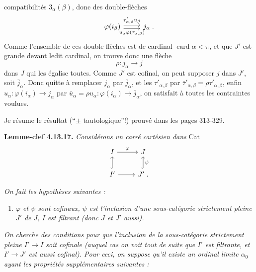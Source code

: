 \documentclass[11pt]{article}
\newcommand{\printedpage}[1]{\marginpar{\footnotesize p.~#1}}
\newcommand{\msp}[1]{\marginpar{\footnotesize [#1]}}
\newcommand{\card}{\operatorname{card}}
\begin{document}
\printedpage{124}

compatibilités $3_\alpha(\beta)$, donc des double-flèches
\[
\begin{tikzcd}
\varphi(i_\beta) \arrow[r, shift left, "\tau'_{\alpha,\beta}u_\beta"] \arrow[r, shift right, "u_\alpha\varphi(\tau_{\alpha,\beta})"'] & j_\alpha \; .
\end{tikzcd}
\]
Comme l'ensemble de ces double-flèches est de cardinal $\card\alpha < \pi$, et que $J'$ est grande devant ledit cardinal, on
\msp{page 329}
trouve donc une flèche
\[
\rho : j_\alpha \longrightarrow j
\]
dans $J$ qui les égalise toutes. Comme $J'$ est cofinal, on peut supposer $j$ dans $J'$, soit $\bar{j}_\alpha$. Donc quitte à remplacer $j_\alpha$ par $\bar{j}_\alpha$, et les $\tau'_{\alpha,\beta}$ par $\bar{\tau}'_{\alpha,\beta} = \rho\tau'_{\alpha,\beta}$, enfin $u_\alpha : \varphi(i_\alpha) \longrightarrow j_\alpha$ par $\bar{u}_\alpha = \rho u_\alpha : \varphi(i_\alpha) \longrightarrow \bar{j}_\alpha$, on satisfait à toutes les contraintes voulues.

Je résume le résultat (``$\pm$ tautologique''!) prouvé dans les pages 313-329.

\textbf{Lemme-clef 4.13.17.} \textit{Considérons un carré cartésien dans} Cat
\[
\begin{tikzcd}
I \arrow[r, "\varphi"] & J \\
I' \arrow[u, hook] \arrow[r] & J' \arrow[u, hook, "\psi"'] \; .
\end{tikzcd}
\]

\textit{On fait les hypothèses suivantes :}

\msp{page 330}

\begin{enumerate}[label={}]
\item[\textit{1)}] \textit{$\varphi$ et $\psi$ sont cofinaux, $\psi$ est l'inclusion d'une sous-catégorie strictement pleine $J'$ de $J$, $I$ est filtrant (donc $J$ et $J'$ aussi).}
\end{enumerate}

\textit{On cherche des conditions pour que l'inclusion de la sous-catégorie strictement pleine $I' \longrightarrow I$ soit cofinale (auquel cas on voit tout de suite que $I'$ est filtrante, et $I' \longrightarrow J'$ est aussi cofinal). Pour ceci, on suppose qu'il existe un \textup{ordinal limite} $\alpha_0$ ayant les propriétés supplémentaires suivantes :}
\end{document}
